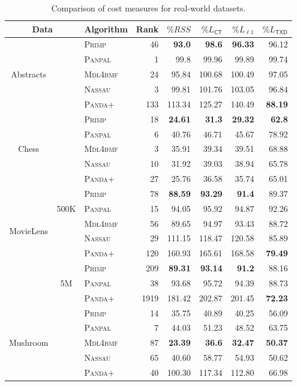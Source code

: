 \begin{table}%
	\centering
	\begin{tabular}{cclrrrrr}\toprule
    \multicolumn{2}{c}{Data} & Algorithm & Rank & $ \%RSS$ & $ \%L_{\mathsf{CT}}$ & $\%L_{\ell 1}$  & $\%L_{\mathsf{TXD}}$  \\ \midrule
\multirow{5}{*}{Abstracts} 
 && \textsc{Primp} & 46 & \textbf{93.0} & \textbf{98.6} & \textbf{96.33} & 96.12\\
 && \textsc{Panpal} & 1 & 99.8 & 99.96 & 99.89 & 99.74\\
 && \textsc{Mdl4bmf} & 24 & 95.84 & 100.68 & 100.49 & 97.05\\ 
 && \textsc{Nassau} & 3 & 99.81 & 101.76 & 103.05 & 96.84\\
 && \textsc{Panda+} & 133 & 113.34 & 125.27 & 140.49 & \textbf{88.19}\\
 \midrule
\multirow{5}{*}{Chess} &
 & \textsc{Primp} & 18 & \textbf{24.61} & \textbf{31.3} & \textbf{29.32} & \textbf{62.8}\\
 && \textsc{Panpal} & 6 & 40.76 & 46.71 & 45.67 & 78.92\\
 && \textsc{Mdl4bmf} & 3 & 35.91 & 39.34 & 39.51 & 68.88\\ 
 && \textsc{Nassau} & 10 & 31.92 & 39.03 & 38.94 & 65.78\\
 && \textsc{Panda+} & 27 & 25.76 & 36.58 & 35.74 & 65.01\\
 \midrule
\multirow{6}{*}{MovieLens} & \multirow{3}{*}{500K}
 & \textsc{Primp} & 78 & \textbf{88.59} & \textbf{93.29} & \textbf{91.4} & 89.37\\
 && \textsc{Panpal} & 15 & 94.05 & 95.92 & 94.87 & 92.26\\
 && \textsc{Mdl4bmf} & 56 & 89.65 & 94.97 & 93.43 & 88.72\\
 && \textsc{Nassau} & 29 & 111.15 & 118.47 & 120.58 & 85.89\\
 && \textsc{Panda+} & 120 & 160.93 & 165.61 & 168.58 & \textbf{79.49}\\
\cmidrule(lr{0em}){2-8}
 & \multirow{3}{*}{5M}
 & \textsc{Primp} & 209 & \textbf{89.31} & \textbf{93.14} & \textbf{91.2} & 88.16\\
 && \textsc{Panpal} & 38 & 93.68 & 95.72 & 94.39 & 88.73\\
 && \textsc{Panda+} & 1919 & 181.42 & 202.87 & 201.45 & \textbf{72.23}\\
 \midrule
\multirow{5}{*}{Mushroom}
 && \textsc{Primp} & 14 & 35.75 & 40.89 & 40.25 & 56.09\\
 && \textsc{Panpal} & 7 & 44.03 & 51.23 & 48.52 & 63.75\\
 && \textsc{Mdl4bmf} & 87 & \textbf{23.39} & \textbf{36.6} & \textbf{32.47} & \textbf{50.37}\\
 && \textsc{Nassau} & 65 & 40.60 & 58.77 & 54.93 & 50.62\\ 
 && \textsc{Panda+} & 40 & 100.30 & 117.34 & 112.80 & 66.98\\
 \bottomrule
    \end{tabular}
    \caption{Comparison of cost measures for real-world datasets.}
    \label{tbl:realWorldCosts}
\end{table}
